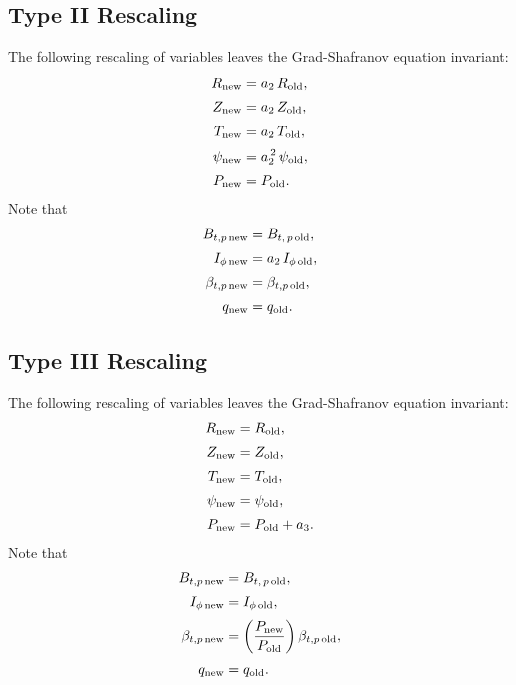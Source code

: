 \documentclass[12pt]{article}
\begin{document}
\subsection{Type II Rescaling}
The following rescaling of variables leaves the Grad-Shafranov equation invariant:
\begin{align}
R_{\rm new}&=a_2\,R_{\rm old},\\[0.5ex]
Z_{\rm new}&=a_2\,Z_{\rm old},\\[0.5ex]
T_{\rm new} &=a_2\,T_{\rm old},\\[0.5ex]
\psi_{\rm new} &=a_2^{\,2}\,\psi_{\rm old},\\[0.5ex]
P_{\rm new} &=P_{\rm old}.
\end{align}
Note that
\begin{align}
B_{t,p\,{\rm new}}&= B_{t,\,p\,{\rm old}},\\[0.5ex]
I_{\phi\,{\rm new}} &=a_2\,I_{\phi\,{\rm old}},\\[0.5ex]
\beta_{t,p\,{\rm new}}&= \beta_{t,p\,{\rm old}},\\[0.5ex]
q_{\rm new} &= q_{\rm old}.
\end{align} 

\subsection{Type III Rescaling}
The following rescaling of variables leaves the Grad-Shafranov equation invariant:
\begin{align}
R_{\rm new}&=R_{\rm old},\\[0.5ex]
Z_{\rm new}&=Z_{\rm old},\\[0.5ex]
T_{\rm new} &=T_{\rm old},\\[0.5ex]
\psi_{\rm new} &=\psi_{\rm old},\\[0.5ex]
P_{\rm new} &=P_{\rm old} +a_3.
\end{align}
Note that
\begin{align}
B_{t,p\,{\rm new}}&= B_{t,\,p\,{\rm old}},\\[0.5ex]
I_{\phi\,{\rm new}} &=I_{\phi\,{\rm old}},\\[0.5ex]
\beta_{t,p\,{\rm new}}&=\left(\frac{P_{\rm new}}{P_{\rm old}}\right)\beta_{t,p\,{\rm old}},\\[0.5ex]
q_{\rm new} &= q_{\rm old}.
\end{align} 
\end{document}
